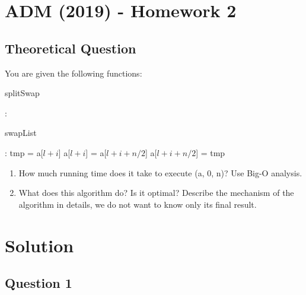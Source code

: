 \documentclass[12pt]{article}
\begin{document}
\section*{ADM (2019) - Homework 2}

\subsection*{Theoretical Question}
\vspace{.5cm}

You are given the following functions:
\vspace{.4cm}


\begin{algorithm}
\caption{splitSwap}\label{splitFun}
\begin{algorithmic}[1]
:
	\State \Return 
\EndIf

\State {}
\State {}
\State {}
\EndFunction
\end{algorithmic}
\end{algorithm}

\begin{algorithm}
\caption{swapList}\label{swapFun}
\begin{algorithmic}[1]
:
\State tmp = a[$l + i$]
\State a[$l + i$] = a[$l + i + n/2$]
\State a[$l + i + n/2$] = tmp
\EndFor
\EndFunction
\end{algorithmic}
\end{algorithm}

\begin{enumerate}
\item How much running time does it take to execute (a, 0, n)? Use Big-O analysis.
\item What does this algorithm do? Is it optimal? Describe the mechanism of the algorithm in details, we do not want to know only its final result.
\end{enumerate}
\pagebreak

\section*{Solution}

\subsection*{Question 1}
\end{document}
